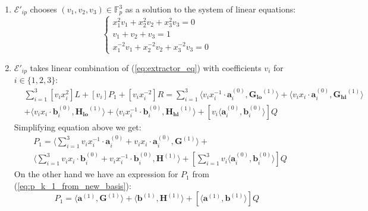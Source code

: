 \documentclass[../lecture-notes-148x210.tex]{subfiles}
\begin{document}
\begin{enumerate}
    \item $\mathcal{E}'_{ip}$ chooses $(v_1, v_2, v_3) \in \mathbb{F}_p^3 $ as a solution to the system of linear equations:
        \begin{equation}
            \begin{cases}
                x_1^2 v_1 + x_2^2 v_2 + x_3^2 v_3 = 0 \\
                v_1 + v_2 + v_3 = 1 \\
                x_1^{-2} v_1 + x_2^{-2} v_2 + x_3^{-2} v_3 = 0
            \end{cases}
            \label{eq:extractor_v}
        \end{equation}
    \item $\mathcal{E}'_{ip}$ takes linear combination of (\ref{eq:extractor_eq}) with coefficients $v_i$ for $i \in \{ 1,2,3 \}$:
        \begin{equation*}
            \begin{aligned}
                & \sum_{i=1}^3 [v_i x_i^2]L + [v_i]P_1 + [v_i x_i^{-2}]R = \sum_{i=1}^3 \langle v_i x_i^{-1} \cdot \mathbf{a}_i^{(0)}, \mathbf{G_{lo}}^{(1)} \rangle + \langle v_i x_i \cdot \mathbf{a}_i^{(0)}, \mathbf{G_{hi}}^{(1)} \rangle \\
                &+ \langle v_i x_i \cdot \mathbf{b}_i^{(0)}, \mathbf{H_{lo}}^{(1)} \rangle + \langle v_i x_i^{-1} \cdot \mathbf{b}_i^{(0)}, \mathbf{H_{hi}}^{(1)} \rangle + [v_i \langle \mathbf{a}_i^{(0)}, \mathbf{b}_i^{(0)} \rangle]Q
            \end{aligned}
        \end{equation*}
        Simplifying equation above we get:
        \begin{equation}
            \begin{aligned}
                & P_1 = \langle \sum_{i=1}^3 v_i x_i^{-1} \cdot \mathbf{a}_i^{(0)} + v_i x_i \cdot \mathbf{a}_i^{(0)}, \mathbf{G}^{(1)} \rangle +\\ 
                & \langle \sum_{i=1}^3 v_i x_i \cdot \mathbf{b}_i^{(0)} + v_i x_i^{-1} \cdot \mathbf{b}_i^{(0)}, \mathbf{H}^{(1)} \rangle + [\sum_{i=1}^3 v_i \langle \mathbf{a}_i^{(0)}, \mathbf{b}_i^{(0)} \rangle]Q
            \end{aligned}
            \label{eq:extractor_p1}
        \end{equation}
        On the other hand we have an expression for $P_1$ from (\ref{eq:p_k_1_from_new_basis}):
        \begin{equation}
            P_{1} = \langle \mathbf{a}^{(1)}, \mathbf{G}^{(1)} \rangle + \langle \mathbf{b}^{(1)}, \mathbf{H}^{(1)} \rangle + [\langle \mathbf{a}^{(1)}, \mathbf{b}^{(1)} \rangle]Q

\end{equation}
\end{enumerate}
\end{document}
